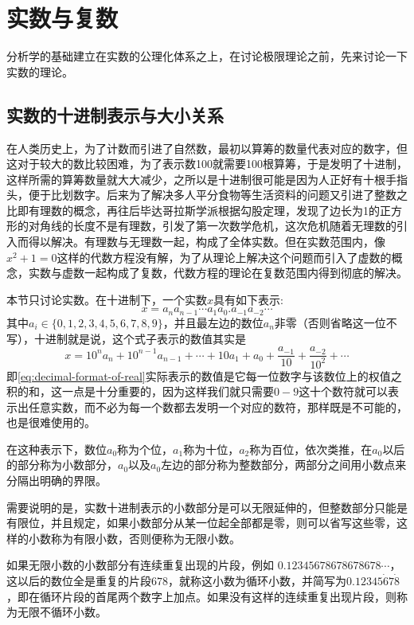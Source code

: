 
\section{实数与复数}
\label{sec:real-number-theory}

分析学的基础建立在实数的公理化体系之上，在讨论极限理论之前，先来讨论一下实数的理论。

\subsection{实数的十进制表示与大小关系}
\label{sec:decimal-system}

在人类历史上，为了计数而引进了自然数，最初以算筹的数量代表对应的数字，但这对于较大的数比较困难，为了表示数100就需要100根算筹，于是发明了十进制，这样所需的算筹数量就大大减少，之所以是十进制很可能是因为人正好有十根手指头，便于比划数字。后来为了解决多人平分食物等生活资料的问题又引进了整数之比即有理数的概念，再往后毕达哥拉斯学派根据勾股定理，发现了边长为1的正方形的对角线的长度不是有理数，引发了第一次数学危机，这次危机随着无理数的引入而得以解决。有理数与无理数一起，构成了全体实数。但在实数范围内，像$x^2+1=0$这样的代数方程没有解，为了从理论上解决这个问题而引入了虚数的概念，实数与虚数一起构成了复数，代数方程的理论在复数范围内得到彻底的解决。

本节只讨论实数。在十进制下，一个实数$x$具有如下表示:
\begin{equation}
  \label{eq:decimal-format-of-real}
 x=a_na_{n-1}\cdots a_1a_0.a_{-1}a_{-2}\cdots 
\end{equation}
其中$a_i \in \{0,1,2,3,4,5,6,7,8,9 \}$，并且最左边的数位$a_n$非零（否则省略这一位不写），十进制就是说，这个式子表示的数值其实是
\[ x=10^na_n+10^{n-1}a_{n-1}+\cdots+10a_1+a_0+\frac{a_{-1}}{10}+\frac{a_{-2}}{10^2}+\cdots \]
即\autoref{eq:decimal-format-of-real}实际表示的数值是它每一位数字与该数位上的权值之积的和，这一点是十分重要的，因为这样我们就只需要$0-9$这十个数符就可以表示出任意实数，而不必为每一个数都去发明一个对应的数符，那样既是不可能的，也是很难使用的。

在这种表示下，数位$a_0$称为个位，$a_1$称为十位，$a_2$称为百位，依次类推，在$a_0$以后的部分称为小数部分，$a_0$以及$a_0$左边的部分称为整数部分，两部分之间用小数点来分隔出明确的界限。

需要说明的是，实数十进制表示的小数部分是可以无限延伸的，但整数部分只能是有限位，并且规定，如果小数部分从某一位起全部都是零，则可以省写这些零，这样的小数称为有限小数，否则便称为无限小数。

如果无限小数的小数部分有连续重复出现的片段，例如 $0.12345678678678678\cdots$，这以后的数位全是重复的片段$678$，就称这小数为循环小数，并简写为$0.12345\dot{6}7\dot{8}$，即在循环片段的首尾两个数字上加点。如果没有这样的连续重复出现片段，则称为无限不循环小数。

